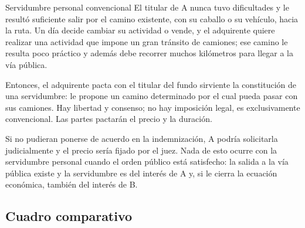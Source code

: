 \documentclass[12pt,oneside]{book}
\begin{document}
\begin{example}{Servidumbre personal convencional}
El titular de A nunca tuvo dificultades y le resultó suficiente salir por el camino existente, con su caballo o su vehículo, hacia la ruta. Un día decide cambiar su actividad o vende, y el adquirente quiere realizar una actividad que impone un gran tránsito de camiones; ese camino le resulta poco práctico y además debe recorrer muchos kilómetros para llegar a la vía pública.

Entonces, el adquirente pacta con el titular del fundo sirviente la constitución de una servidumbre: le propone un camino determinado por el cual pueda pasar con sus camiones. Hay libertad y consenso; no hay imposición legal, es exclusivamente convencional. Las partes pactarán el precio y la duración.

Si no pudieran ponerse de acuerdo en la indemnización, A podría solicitarla judicialmente y el precio sería fijado por el juez. Nada de esto ocurre con la servidumbre personal cuando el orden público está satisfecho: la salida a la vía pública existe y la servidumbre es del interés de A y, si le cierra la ecuación económica, también del interés de B.
\end{example}

\subsection{Cuadro comparativo}
\end{document}
